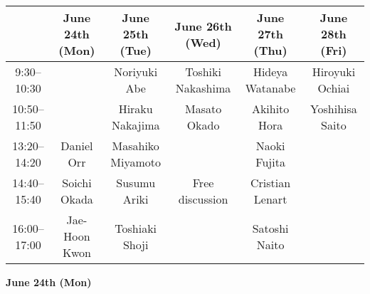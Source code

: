\documentclass[12pt,landscape]{jarticle}
\begin{document}
\begin{table}[h]
\centering
\begin{tabular}{|c||c|c|c|c|c|}
\hline
 & June 24th (Mon) & June 25th (Tue) & June 26th (Wed) & June 27th (Thu) & June 28th (Fri) \\
\hline \hline
9:30--10:30 & \cellcolor{gray} & Noriyuki Abe & Toshiki Nakashima & Hideya Watanabe & Hiroyuki Ochiai \\
\hline
10:50--11:50 & \cellcolor{gray} & Hiraku Nakajima & Masato Okado & Akihito Hora & Yoshihisa Saito \\
\hline \hline
13:20--14:20 & Daniel Orr & Masahiko Miyamoto & \cellcolor{yellow} & Naoki Fujita & \cellcolor{gray} \\
\hline
14:40--15:40 & Soichi Okada & Susumu Ariki & \cellcolor{yellow}Free discussion & Cristian Lenart & \cellcolor{gray} \\
\hline
16:00--17:00 & Jae-Hoon Kwon & Toshiaki Shoji & \cellcolor{yellow} & Satoshi Naito & \cellcolor{gray} \\
\hline
\end{tabular}
\end{table}


\begin{center}
{\bf\Large June 24th (Mon)}
\end{center}
\end{document}
